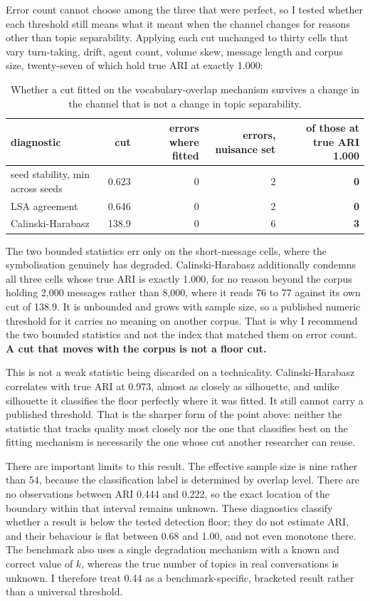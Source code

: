 \documentclass[10pt]{article}
\begin{document}
Error count cannot choose among the three that were perfect, so I tested whether each threshold still
means what it meant when the channel changes for reasons other than topic separability. Applying each
cut unchanged to thirty cells that vary turn-taking, drift, agent count, volume skew, message length
and corpus size, twenty-seven of which hold true ARI at exactly 1.000:

\begin{table}[h]
\centering
\begin{tabular}{lrrrr}
\toprule
diagnostic & cut & errors where fitted & errors, nuisance set & of those at true ARI 1.000 \\
\midrule
seed stability, min across seeds & 0.623 & 0 & 2 & \textbf{0} \\
LSA agreement                    & 0.646 & 0 & 2 & \textbf{0} \\
Calinski-Harabasz                & 138.9 & 0 & 6 & \textbf{3} \\
\bottomrule
\end{tabular}
\caption{Whether a cut fitted on the vocabulary-overlap mechanism survives a change in the channel
that is not a change in topic separability.}
\end{table}

The two bounded statistics err only on the short-message cells, where the symbolisation genuinely has
degraded. Calinski-Harabasz additionally condemns all three cells whose true ARI is exactly 1.000,
for no reason beyond the corpus holding 2,000 messages rather than 8,000, where it reads 76 to 77
against its own cut of 138.9. It is unbounded and grows with sample size, so a published numeric
threshold for it carries no meaning on another corpus. That is why I recommend the two bounded
statistics and not the index that matched them on error count. \textbf{A cut that moves with the
corpus is not a floor cut.}

This is not a weak statistic being discarded on a technicality. Calinski-Harabasz correlates with
true ARI at 0.973, almost as closely as silhouette, and unlike silhouette it classifies the floor
perfectly where it was fitted. It still cannot carry a published threshold. That is the sharper form
of the point above: neither the statistic that tracks quality most closely nor the one that
classifies best on the fitting mechanism is necessarily the one whose cut another researcher can
reuse.

There are important limits to this result. The effective sample size is nine rather than 54, because
the classification label is determined by overlap level. There are no observations between ARI 0.444
and 0.222, so the exact location of the boundary within that interval remains unknown. These
diagnostics classify whether a result is below the tested detection floor; they do not estimate ARI,
and their behaviour is flat between 0.68 and 1.00, and not even monotone there. The benchmark also
uses a single degradation mechanism with a known and correct value of $k$, whereas the true number of
topics in real conversations is unknown. I therefore treat 0.44 as a benchmark-specific, bracketed
result rather than a universal threshold.
\end{document}
